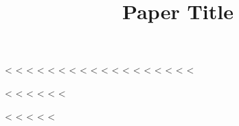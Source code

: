 {{<%
\ifpdftex
<%
<%
<%
<%
<%
<%
<%
<%
<%
<%
<%
<%
<%
<%
\fi
<%
<%
<%

<%
<%
<%
<%
<%
<%

<%
<%
<%
\raggedbottom
<%
<%

\title{Paper Title}

\author{ \and {}}



%
%

\maketitle

}}
